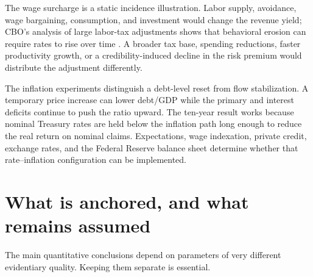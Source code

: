 \documentclass[11pt]{article}
\begin{document}
The wage surcharge is a static incidence illustration.  Labor supply, avoidance, wage
bargaining, consumption, and investment would change the revenue yield; CBO's analysis of
large labor-tax adjustments shows that behavioral erosion can require rates to rise over
time \cite{cboTaxStudy}.  A broader tax base, spending reductions, faster productivity
growth, or a credibility-induced decline in the risk premium would distribute the adjustment
differently.

The inflation experiments distinguish a debt-level reset from flow stabilization.  A
temporary price increase can lower debt/GDP while the primary and interest deficits continue
to push the ratio upward.  The ten-year result works because nominal Treasury rates are held
below the inflation path long enough to reduce the real return on nominal claims.
Expectations, wage indexation, private credit, exchange rates, and the Federal Reserve balance
sheet determine whether that rate--inflation configuration can be implemented.

\section{What is anchored, and what remains assumed}

The main quantitative conclusions depend on parameters of very different evidentiary
quality.  Keeping them separate is essential.
\end{document}
